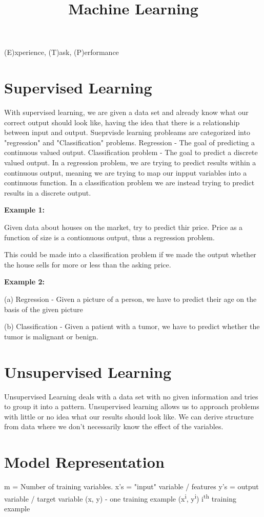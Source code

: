 \documentclass{article}
\title{Machine Learning}
\begin{document}
    \maketitle
    (E)xperience, (T)ask, (P)erformance
    \section{Supervised Learning}
    With supervised learning, we are given a data set and already know what our
    correct output should look like, having the idea that there is a
    relationship between input and output.
    Sueprvisde learning probleams are categorized into "regression" and
    "Classification" problems.
    Regression - The goal of predicting a continuous valued output.
    Classification problem - The goal to predict a discrete valued output.
    In a regression problem, we are trying to
    predict results within a continuous output, meaning we are trying to map
    our inpput variables into a continuous function.
    In a classification problem we are instead trying to predict results in a
    discrete output.

    \textbf{Example 1:}


    Given data about houses on the market, try to predict
    thir price. Price as a function of size is a contionuous output, thus a
    regression problem.

    This could be made into a classification problem if we made the output
    whether the house sells for more or less than the asking price.


    \textbf{Example 2:}


    (a) Regression - Given a picture of a person, we have to predict their age
    on the basis of the given picture


    (b) Classification - Given a patient with a tumor, we have to predict
    whether the tumor is malignant or benign.


    \section{Unsupervised Learning}
    Unsupervised Learning deals with a data set with no given information and
    tries to group it into a pattern.
    Unsupervised learning allows us to approach problems with little or no idea
    what our results should look like. We can derive structure from data where
    we don't necessarily know the effect of the variables.


    \section{Model Representation}
    m = Number of training variables.
    x's = "input" variable / features
    y's = output variable / target variable
    (x, y) - one training example
    (x\textsuperscript{i}, y\textsuperscript{i}) i\textsuperscript{th} training
    example
\end{document}
